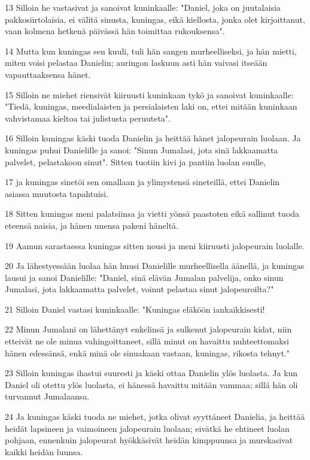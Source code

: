 \par 13 Silloin he vastasivat ja sanoivat kuninkaalle: "Daniel, joka on juutalaisia pakkosiirtolaisia, ei välitä sinusta, kuningas, eikä kiellosta, jonka olet kirjoittanut, vaan kolmena hetkenä päivässä hän toimittaa rukouksensa".
\par 14 Mutta kun kuningas sen kuuli, tuli hän sangen murheelliseksi, ja hän mietti, miten voisi pelastaa Danielin; auringon laskuun asti hän vaivasi itseään vapauttaaksensa hänet.
\par 15 Silloin ne miehet riensivät kiiruusti kuninkaan tykö ja sanoivat kuninkaalle: "Tiedä, kuningas, meedialaisten ja persialaisten laki on, ettei mitään kuninkaan vahvistamaa kieltoa tai julistusta peruuteta".
\par 16 Silloin kuningas käski tuoda Danielin ja heittää hänet jalopeurain luolaan. Ja kuningas puhui Danielille ja sanoi: "Sinun Jumalasi, jota sinä lakkaamatta palvelet, pelastakoon sinut". Sitten tuotiin kivi ja pantiin luolan suulle,
\par 17 ja kuningas sinetöi sen omallaan ja ylimystensä sineteillä, ettei Danielin asiassa muutosta tapahtuisi.
\par 18 Sitten kuningas meni palatsiinsa ja vietti yönsä paastoten eikä sallinut tuoda eteensä naisia, ja hänen unensa pakeni häneltä.
\par 19 Aamun sarastaessa kuningas sitten nousi ja meni kiiruusti jalopeurain luolalle.
\par 20 Ja lähestyessään luolaa hän huusi Danielille murheellisella äänellä, ja kuningas lausui ja sanoi Danielille: "Daniel, sinä elävän Jumalan palvelija, onko sinun Jumalasi, jota lakkaamatta palvelet, voinut pelastaa sinut jalopeuroilta?"
\par 21 Silloin Daniel vastasi kuninkaalle: "Kuningas eläköön iankaikkisesti!
\par 22 Minun Jumalani on lähettänyt enkelinsä ja sulkenut jalopeurain kidat, niin etteivät ne ole minua vahingoittaneet, sillä minut on havaittu nuhteettomaksi hänen edessänsä, enkä minä ole sinuakaan vastaan, kuningas, rikosta tehnyt."
\par 23 Silloin kuningas ihastui suuresti ja käski ottaa Danielin ylös luolasta. Ja kun Daniel oli otettu ylös luolasta, ei hänessä havaittu mitään vammaa; sillä hän oli turvannut Jumalaansa.
\par 24 Ja kuningas käski tuoda ne miehet, jotka olivat syyttäneet Danielia, ja heittää heidät lapsineen ja vaimoineen jalopeurain luolaan; eivätkä he ehtineet luolan pohjaan, ennenkuin jalopeurat hyökkäsivät heidän kimppuunsa ja murskasivat kaikki heidän luunsa.
